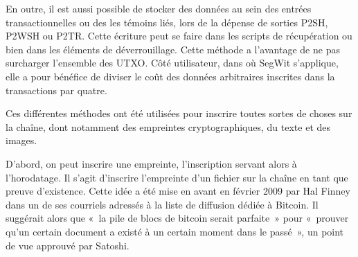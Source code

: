 En outre, il est aussi possible de stocker des données au sein des entrées transactionnelles ou des les témoins liés, lors de la dépense de sorties P2SH, P2WSH ou P2TR. Cette écriture peut se faire dans les scripts de récupération ou bien dans les éléments de déverrouillage. Cette méthode a l'avantage de ne pas surcharger l'ensemble des UTXO. Côté utilisateur, dans où SegWit s'applique, elle a pour bénéfice de diviser le coût des données arbitraires inscrites dans la transactions par quatre.


Ces différentes méthodes ont été utilisées pour inscrire toutes sortes de choses sur la chaîne, dont notamment des empreintes cryptographiques, du texte et des images.

D'abord, on peut inscrire une empreinte, l'inscription servant alors à l'horodatage. Il s'agit d'inscrire l'empreinte d'un fichier sur la chaîne en tant que preuve d'existence. Cette idée a été mise en avant en février 2009 par Hal Finney dans un de ses courriels adressés à la liste de diffusion dédiée à Bitcoin. Il suggérait alors que «~la pile de blocs de bitcoin serait parfaite~» pour «~prouver qu'un certain document a existé à un certain moment dans le passé~», un point de vue approuvé par Satoshi. %

